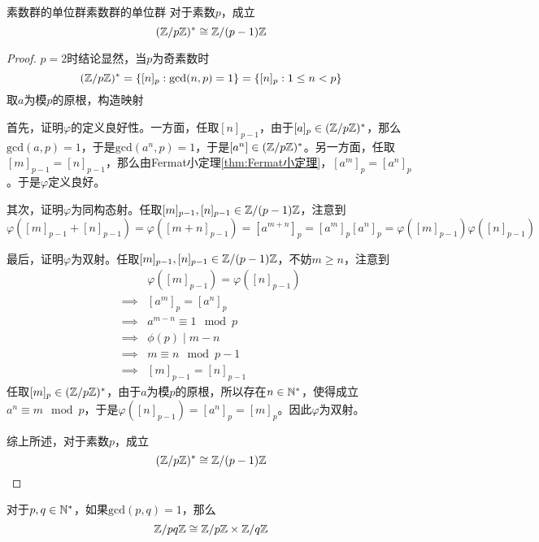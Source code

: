 \begin{theorem}{素数群的单位群}{素数群的单位群}
	对于素数$p$，成立
	\[ 
	(\mathbb{Z}/p\mathbb{Z})^*\cong \mathbb{Z}/(p-1)\mathbb{Z}
	 \]
\end{theorem}

\begin{proof}
	$p=2$时结论显然，当$p$为奇素数时
	\[ 
	(\mathbb{Z}/p\mathbb{Z})^*=\{ [n]_p:\mathrm{gcd}(n,p)=1 \}=\{ [n]_{p}:1\le n<p \}
	\]
	 取$a$为模$p$的原根，构造映射
	 
	 首先，证明$\varphi$的定义良好性。一方面，任取$[n]_{p-1}$，由于$[a]_p\in (\mathbb{Z}/p\mathbb{Z})^*$，那么$\mathrm{gcd}(a,p)=1$，于是$\mathrm{gcd}(a^n,p)=1$，于是$[a^n]\in(\mathbb{Z}/p\mathbb{Z})^*$。另一方面，任取$[m]_{p-1}=[n]_{p-1}$，那么由Fermat小定理\ref{thm:Fermat小定理}，$[a^m]_p=[a^n]_p$。于是$\varphi$定义良好。
	 
	 其次，证明$\varphi$为同构态射。任取$[m]_{p-1},[n]_{p-1}\in \mathbb{Z}/(p-1)\mathbb{Z}$，注意到
	 $$
	 \varphi([m]_{p-1}+[n]_{p-1})=\varphi([m+n]_{p-1})=[a^{m+n}]_p=[a^m]_p[a^n]_p=\varphi([m]_{p-1})\varphi([n]_{p-1})
	 $$
	 
	 最后，证明$\varphi$为双射。任取$[m]_{p-1},[n]_{p-1}\in \mathbb{Z}/(p-1)\mathbb{Z}$，不妨$m\ge n$，注意到
	 \begin{align*}
	 	& \varphi([m]_{p-1})=\varphi([n]_{p-1})\\
	 	\implies & [a^m]_{p}=[a^n]_p\\
	 	\implies & a^{m-n}\equiv 1\mod p\\
	 	\implies & \phi(p)\mid m-n\\
	 	\implies & m\equiv n\mod p-1\\
	 	\implies & [m]_{p-1}=[n]_{p-1}
	 \end{align*}
	 任取$[m]_{p}\in(\mathbb{Z}/p\mathbb{Z})^*$，由于$a$为模$p$的原根，所以存在$n\in\mathbb{N}^*$，使得成立$a^n\equiv m\mod p$，于是$\varphi([n]_{p-1})=[a^n]_{p}=[m]_p$。因此$\varphi$为双射。
	 
	 综上所述，对于素数$p$，成立
	 $$
	 (\mathbb{Z}/p\mathbb{Z})^*\cong \mathbb{Z}/(p-1)\mathbb{Z}
	 $$
\end{proof}

\begin{theorem}
	对于$p,q\in\mathbb{N}^*$，如果$\mathrm{gcd}(p,q)=1$，那么
	\[ 
	\mathbb{Z}/pq\mathbb{Z}\cong \mathbb{Z}/p\mathbb{Z}\times \mathbb{Z}/q\mathbb{Z}
	 \]
\end{theorem}

